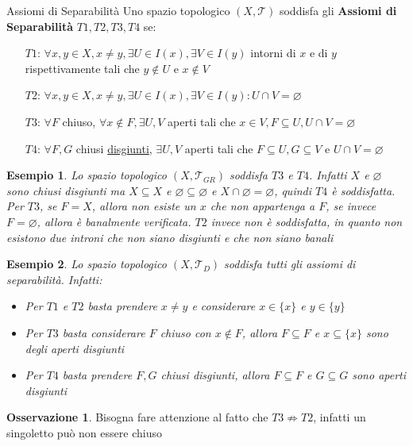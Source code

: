 \documentclass[11pt,a4paper,twoside]{article}
\newtheorem{es}{Esempio}
\theoremstyle{definition}
\newtheorem*{oss}{Osservazione}
\begin{document}
\begin{defn}{Assiomi di Separabilità}{}
	Uno spazio topologico $(X, \mathcal T)$ soddisfa gli \textbf{Assiomi di Separabilità} $T1,T2,T3,T4$ se:
	\begin{itemize}
		\item[$T1$:] $\forall x,y \in X,x \neq y,\exists U \in I(x), \exists V \in I(y)$ intorni di $x$ e di $y$ rispettivamente tali che $y \not \in U$ e $x \not \in V$
		\item[$T2$:] $\forall x, y \in X, x\neq y, \exists U \in I(x), \exists V \in I(y):U \cap V = \varnothing$
		\item[$T3$:] $\forall F$ chiuso, $\forall x \not \in F, \exists U,V$ aperti tali che $x \in V, F \subseteq U, U \cap V = \varnothing$
		\item[$T4$:] $\forall F,G$ chiusi \underline{disgiunti}, $\exists U,V$ aperti tali che $F \subseteq U, G \subseteq V$ e $U \cap V = \varnothing$
	\end{itemize}
\end{defn}

\begin{es}
	Lo spazio topologico $(X, \mathcal T_{GR})$ soddisfa $T3$ e $T4$. Infatti $X$ e $\varnothing$ sono chiusi disgiunti ma $X \subseteq X$ e $\varnothing \subseteq \varnothing$ e $X \cap \varnothing = \varnothing$, quindi $T4$ è soddisfatta. Per $T3$, se $F = X$, allora non esiste un $x$ che non appartenga a $F$, se invece $F = \varnothing$, allora è banalmente verificata. $T2$ invece non è soddisfatta, in quanto non esistono due introni che non siano disgiunti e che non siano banali
\end{es}

\begin{es}
	Lo spazio topologico $(X, \mathcal T_D)$ soddisfa tutti gli assiomi di separabilità. Infatti:
	\begin{itemize}
		\item Per $T1$ e $T2$ basta prendere $x \neq y$ e considerare $x \in \{x\}$ e $y \in \{y\}$
		\item Per $T3$ basta considerare $F$ chiuso con $x \notin F$, allora $F\subseteq F$ e $x \subseteq \{x\}$ sono degli aperti disgiunti
		\item Per $T4$ basta prendere $F,G$ chiusi disgiunti, allora $F \subseteq F$ e $G \subseteq G$ sono aperti disgiunti
	\end{itemize}
\end{es}

\begin{oss}
	Bisogna fare attenzione al fatto che $T3\not \Rightarrow T2$, infatti un singoletto può non essere chiuso
\end{oss}
\end{document}
